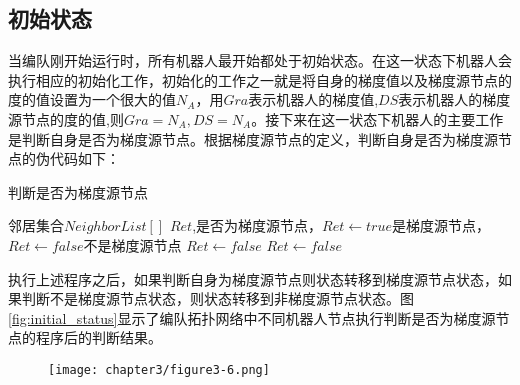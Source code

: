 \subsection{初始状态}
当编队刚开始运行时，所有机器人最开始都处于初始状态。在这一状态下机器人会执行相应的初始化工作，初始化的工作之一就是将自身的梯度值以及梯度源节点的度的值设置为一个很大的值$N_A$，用$Gra$表示机器人的梯度值,$DS$表示机器人的梯度源节点的度的值,则$Gra=N_A, DS=N_A$。接下来在这一状态下机器人的主要工作是判断自身是否为梯度源节点。根据梯度源节点的定义，判断自身是否为梯度源节点的伪代码如下：\\
\begin{algorithm}
	\caption{判断是否为梯度源节点}
	\label{IsSourceNode}
	\begin{algorithmic}[1]
		\Require 邻居集合$NeighborList[]$
		\Ensure $Ret$,是否为梯度源节点，$Ret \leftarrow true$是梯度源节点，$Ret \leftarrow false$不是梯度源节点
			\State $Ret \gets false$
					\State $Ret \gets false$
				\EndIf
			\EndFor 
			\State {}
		\EndFunction
	\end{algorithmic}	
\end{algorithm}
执行上述程序之后，如果判断自身为梯度源节点则状态转移到梯度源节点状态，如果判断不是梯度源节点状态，则状态转移到非梯度源节点状态。图\ref{fig:initial_status}显示了编队拓扑网络中不同机器人节点执行判断是否为梯度源节点的程序后的判断结果。
\begin{figure}[!htbp]
	\centering
	\texttt{[image: chapter3/figure3-6.png]}
\end{figure}

